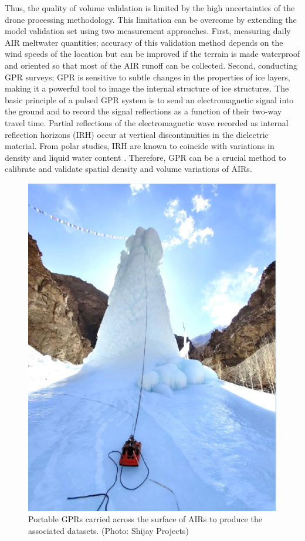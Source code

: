 Thus, the quality of volume validation is limited by the high uncertainties of the drone processing
methodology. This limitation can be overcome by extending the model validation set using two measurement
approaches. First, measuring daily AIR meltwater quantities; accuracy of this validation method
depends on the wind speeds of the location but can be improved if the terrain is made waterproof and oriented so
that most of the AIR runoff can be collected. Second, conducting \ac{GPR} surveys; \ac{GPR} is
sensitive to subtle changes in the properties of ice layers, making it a powerful tool to image the internal
structure of ice structures. The basic principle of a pulsed \ac{GPR} system is to send an electromagnetic
signal into the ground and to record the signal reflections as a function of their two-way travel time. Partial
reflections of the electromagnetic wave recorded as internal reflection horizons (IRH) occur at vertical
discontinuities in the dielectric material. From polar studies, IRH are known to coincide with variations in
density and liquid water content \citep{forster2014extensive}. Therefore, \ac{GPR} can be a crucial method to
calibrate and validate spatial density and volume variations of \ac{AIRs}.


\begin{figure}[htb]
  \centering
	\includegraphics[width=8 cm]{figs/gpr_survey}
  \caption{Portable \ac{GPR}s carried across the surface of \ac{AIRs} to produce the associated datasets.
    (Photo: Shijay Projects)}
	\label{fig:gpr_survey}
\end{figure}

